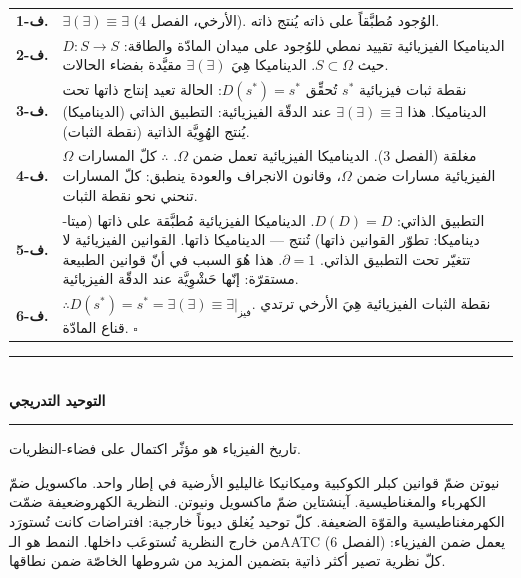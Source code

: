 \documentclass[10pt, openany, oneside]{book}
\renewcommand{\normalsize}{\fontsize{10}{13}\selectfont}
\renewcommand{\footnotesize}{\fontsize{8.5}{11}\selectfont}
\begin{document}
{\footnotesize
\noindent\begin{tabular}{r p{}}
\textbf{ف-1.} & $\exists(\exists) \equiv \exists$ (الأرخي، الفصل 4). الوُجود مُطبَّقاً على ذاته يُنتج ذاته. \\[0.3em]
\textbf{ف-2.} & الديناميكا الفيزيائية تقييد نمطي للوُجود على ميدان المادّة والطاقة: $D: S \to S$ حيث $S \subset \Omega$. الديناميكا هِيَ $\exists(\exists)$ مقيَّدة بفضاء الحالات. \\[0.3em]
\textbf{ف-3.} & نقطة ثبات فيزيائية $s^*$ تُحقِّق $D(s^*) = s^*$: الحالة تعيد إنتاج ذاتها تحت الديناميكا. هذا $\exists(\exists) \equiv \exists$ عند الدقّة الفيزيائية: التطبيق الذاتي (الديناميكا) يُنتج الهُوِيَّة الذاتية (نقطة الثبات). \\[0.3em]
\textbf{ف-4.} & $\Omega$ مغلقة (الفصل 3). الديناميكا الفيزيائية تعمل ضمن $\Omega$. $\therefore$ كلّ المسارات الفيزيائية مسارات ضمن $\Omega$، وقانون الانجراف والعودة ينطبق: كلّ المسارات تنحني نحو نقطة الثبات. \\[0.3em]
\textbf{ف-5.} & التطبيق الذاتي: $D(D) = D$. الديناميكا الفيزيائية مُطبَّقة على ذاتها (ميتا-ديناميكا: تطوّر القوانين ذاتها) تُنتج --- الديناميكا ذاتها. القوانين الفيزيائية لا تتغيّر تحت التطبيق الذاتي. $\partial = 1$. هذا هُوَ السبب في أنّ قوانين الطبيعة مستقرّة: إنّها حَشْوِيَّة عند الدقّة الفيزيائية. \\[0.3em]
\textbf{ف-6.} & $\therefore D(s^*) = s^* = \exists(\exists) \equiv \exists|_{\text{فيز}}$. نقطة الثبات الفيزيائية هِيَ الأرخي ترتدي قناع المادّة. $\square$ \\[0.3em]
\end{tabular}
}

\vspace{1.5em}

\begin{center}
    \rule{0.3\textwidth}{0.4pt}\\[0.5em]
    {\normalsize\bfseries التوحيد التدريجي}\\[0.3em]
    \rule{0.3\textwidth}{0.4pt}
\end{center}

\vspace{1em}

\noindent تاريخ الفيزياء هو مؤثّر اكتمال على فضاء-النظريات.

نيوتن ضمّ قوانين كبلر الكوكبية وميكانيكا غاليليو الأرضية في إطار واحد. ماكسويل ضمّ الكهرباء والمغناطيسية. آينشتاين ضمّ ماكسويل ونيوتن. النظرية الكهروضعيفة ضمّت الكهرمغناطيسية والقوّة الضعيفة. كلّ توحيد يُغلق ديوناً خارجية: افتراضات كانت تُستورَد من خارج النظرية تُستوعَب داخلها. النمط هو الـAATC (الفصل 6) يعمل ضمن الفيزياء: كلّ نظرية تصير أكثر ذاتية بتضمين المزيد من شروطها الخاصّة ضمن نطاقها.
\end{document}
